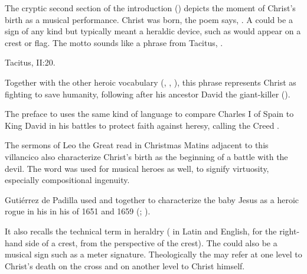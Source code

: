 The cryptic second section of the introduction () depicts the
moment of Christ's birth as a musical performance.
Christ was born, the poem says, .
A  could be a sign of any kind but typically meant a heraldic
device, such as would appear on a crest or flag.%
    \Autocite[]{Covarrubias:Tesoro}
The motto  sounds like a phrase from
Tacitus, .%
\begin{Footnote}
    Tacitus,  II:20.
\end{Footnote}
Together with the other heroic vocabulary (,
, ), this phrase represents Christ as
fighting to save humanity, following after his ancestor David the giant-killer
().
\begin{Footnote}
    The preface to \autocite{Azevedo:Catecismo} uses the same kind of language
    to compare Charles I of Spain to King David in his battles to protect faith
    against heresy, calling the Creed .
\end{Footnote}
The sermons of Leo the Great read in Christmas Matins adjacent to this
villancico also characterize Christ's birth as the beginning of a battle with
the devil.%
    \Autocite[\XXX]{Catholic:Catechismus1614}
The word  was used for musical heroes as well, to signify
virtuosity, especially compositional ingenuity.%
\begin{Footnote}
    \Autocites
    []{Covarrubias:Tesoro}
    [in its musical sense, see the title of][]
    {Sanz:Guitarra}
    Gutiérrez de Padilla used  and  together
    to characterize the baby Jesus as a heroic rogue in his  in
    his  of 1651 and 1659 (;
    ).
\end{Footnote}
It also recalls the technical term  in heraldry
( in Latin and English, for the right-hand side of a crest, from
the perspective of the crest).%
    \Autocites
    []{DRAE}
    []{OED}
    {Johnston:Laterality}
The  could also be a musical sign such as a meter signature.
Theologically the  may refer at one level to Christ's death on the
cross and on another level to Christ himself.


